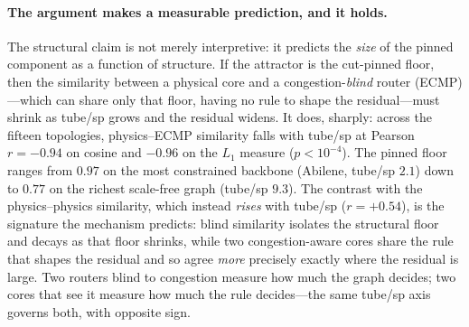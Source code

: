 \paragraph{The argument makes a measurable prediction, and it holds.} The
structural claim is not merely interpretive: it predicts the \emph{size} of the
pinned component as a function of structure. If the attractor is the cut-pinned
floor, then the similarity between a physical core and a congestion-\emph{blind}
router (ECMP)---which can share only that floor, having no rule to shape the
residual---must shrink as tube/sp grows and the residual widens.
It does, sharply: across the fifteen topologies, physics--ECMP similarity falls
with tube/sp at Pearson $r=-0.94$ on cosine and $-0.96$ on the $L_1$ measure
($p<10^{-4}$). The pinned floor ranges from $0.97$ on the most constrained
backbone (Abilene, tube/sp $2.1$) down to $0.77$ on the richest scale-free
graph (tube/sp $9.3$).
The contrast with the physics--physics similarity, which instead \emph{rises}
with tube/sp ($r=+0.54$), is the signature the mechanism predicts: blind
similarity isolates the structural floor and decays as that floor shrinks,
while two congestion-aware cores share the rule that shapes the residual and so
agree \emph{more} precisely exactly where the residual is large. Two routers
blind to congestion measure how much the graph decides; two cores that see it
measure how much the rule decides---the same tube/sp axis governs both, with
opposite sign.


